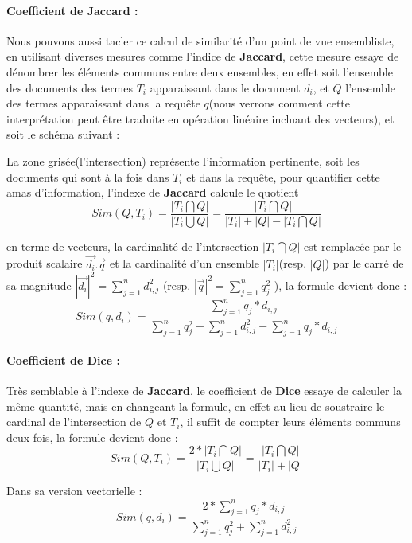 \documentclass[12pt]{report}
\begin{document}
			\paragraph{Coefficient de Jaccard : }
			Nous pouvons aussi tacler ce calcul de similarité d'un point de vue ensembliste, en utilisant 
			diverses mesures comme l'indice de \textbf{Jaccard}, cette mesure essaye de dénombrer les 
			éléments communs entre deux ensembles, en effet soit l'ensemble des documents des termes $T_i$
			apparaissant dans le document $d_i$, et $Q$ l'ensemble des termes apparaissant 
			dans la requête $q$(nous verrons comment cette interprétation peut être traduite en opération
			linéaire incluant des vecteurs), et soit le schéma suivant :
			\begin{center}
				\begin{venndiagram2sets}[labelA={$T_i$}, labelB={$Q$}]
					\fillACapB
				\end{venndiagram2sets}
			\end{center}
			\par 
			La zone grisée(l'intersection) représente l'information pertinente, soit les documents qui sont à 
			la fois dans $T_i$ et dans la requête, pour quantifier cette amas d'information, l'indexe de 
			\textbf{Jaccard} calcule le quotient 
			\[
				Sim(Q,T_i) = \frac{|T_i \bigcap Q|}{|T_i \bigcup Q|} = \frac{|T_i \bigcap Q|}{|T_i|+|Q|-|T_i \bigcap Q|}
			\]
			\newpage
			\par en terme de vecteurs, la cardinalité de l'intersection $|T_i \bigcap Q|$ est remplacée
			par le produit scalaire $\vec{d_i}.\vec{q}$ et la cardinalité d'un ensemble $|T_i|$(resp. $|Q|$) 
			par le carré de sa magnitude $|\vec{d_i}|^2 = \sum_{j=1}^{n} d_{i,j}^2$ 
			(resp. $|\vec{q}|^2 = \sum_{j=1}^{n} q_{j}^2$ ), la formule devient donc : 
			\[
				Sim(q,d_i) = \frac{\sum_{j=1}^{n} q_{j} * d_{i,j}}
								  {\sum_{j=1}^{n} q_{j}^2 + \sum_{j=1}^{n} d_{i,j}^2 - \sum_{j=1}^{n} q_{j} * d_{i,j}}
			\]
			\paragraph{Coefficient de Dice : }
			Très semblable à l'indexe de \textbf{Jaccard}, le coefficient de \textbf{Dice} essaye de 
			calculer la même quantité, mais en changeant la formule, en effet au lieu de soustraire le cardinal 
			de l'intersection de $Q$ et $T_i$, il suffit de compter leurs éléments communs deux fois, la formule 
			devient donc :
			\[
				Sim(Q,T_i) = \frac{2*|T_i \bigcap Q|}{|T_i \bigcup Q|} = \frac{|T_i \bigcap Q|}{|T_i|+|Q|}
			\]
			\par Dans sa version vectorielle : 
			\[
				Sim(q,d_i) = \frac{2*\sum_{j=1}^{n} q_{j} * d_{i,j}}
				{\sum_{j=1}^{n} q_{j}^2 + \sum_{j=1}^{n} d_{i,j}^2 }
			\]
			
\end{document}
